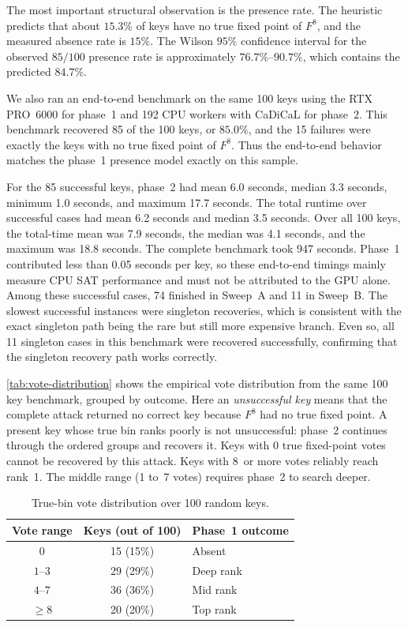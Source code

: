 \documentclass[version=preprint]{iacrcc}
\begin{document}
The most important structural observation is the presence rate.
The heuristic predicts that about $15.3\%$ of keys have no true fixed point of $F^8$, and the measured absence rate is $15\%$.
The Wilson $95\%$ confidence interval for the observed $85/100$ presence rate is approximately $76.7\%$--$90.7\%$, which contains the predicted $84.7\%$.

We also ran an end-to-end benchmark on the same 100 keys using the RTX PRO~6000 for phase~1 and 192 CPU workers with CaDiCaL for phase~2.
This benchmark recovered 85 of the 100 keys, or $85.0\%$, and the 15 failures were exactly the keys with no true fixed point of $F^8$.
Thus the end-to-end behavior matches the phase~1 presence model exactly on this sample.

For the 85 successful keys, phase~2 had mean 6.0 seconds, median 3.3 seconds, minimum 1.0 seconds, and maximum 17.7 seconds.
The total runtime over successful cases had mean 6.2 seconds and median 3.5 seconds.
Over all 100 keys, the total-time mean was 7.9 seconds, the median was 4.1 seconds, and the maximum was 18.8 seconds.
The complete benchmark took 947 seconds.
Phase~1 contributed less than 0.05 seconds per key, so these end-to-end timings mainly measure CPU SAT performance and must not be attributed to the GPU alone.
Among these successful cases, 74 finished in Sweep~A and 11 in Sweep~B.
The slowest successful instances were singleton recoveries, which is consistent with the exact singleton path being the rare but still more expensive branch.
Even so, all 11 singleton cases in this benchmark were recovered successfully, confirming that the singleton recovery path works correctly.

\autoref{tab:vote-distribution} shows the empirical vote distribution from the same 100 key benchmark, grouped by outcome.
Here an \emph{unsuccessful key} means that the complete attack returned no correct key because $F^8$ had no true fixed point.
A present key whose true bin ranks poorly is not unsuccessful: phase~2 continues through the ordered groups and recovers it.
Keys with 0 true fixed-point votes cannot be recovered by this attack.
Keys with 8~or more votes reliably reach rank~1.
The middle range (1 to~7 votes) requires phase~2 to search deeper.

\begin{table}[htbp]
  \centering
  \caption{True-bin vote distribution over 100 random keys.}
  \label{tab:vote-distribution}
  \begin{tabular}{ccl}
    \toprule
    Vote range & Keys (out of 100) & Phase~1 outcome \\
    \midrule
    $0$ & 15 (15\%) & Absent \\
    $1$--$3$ & 29 (29\%) & Deep rank \\
    $4$--$7$ & 36 (36\%) & Mid rank \\
    $\geq 8$ & 20 (20\%) & Top rank \\
    \bottomrule
  \end{tabular}
\end{table}
\end{document}

